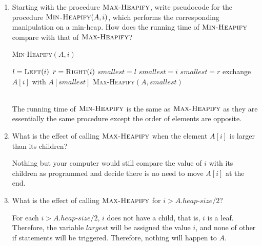 \documentclass[12pt,reqno]{amsart}
\newif\ifanswer
\begin{document}
\begin{enumerate}[1.]
\item Starting with the procedure $\textsc{Max-Heapify}$, write pseudocode for the procedure $\textsc{Min}$-$\textsc{Heapify}(A, i)$, which performs the corresponding manipulation on a min-heap. How does the running time of $\textsc{Min-Heapify}$ compare with that of $\textsc{Max-Heapify}$?

\ifanswer
{}
\begin{algorithm}
\caption{\textsc{Min-Heapify}$(A, i)$}
\begin{algorithmic}[1]
\STATE $l = \textsc{Left}(i)$
\STATE $r = \textsc{Right}(i)$
    \STATE $smallest = l$
\ELSE
    \STATE $smallest = i$
\ENDIF
{}
    \STATE $smallest = r$
\ENDIF
{}
    \STATE exchange $A[i]$ with $A[smallest]$
    \STATE \textsc{Max-Heapify}$(A, smallest)$
\ENDIF
\end{algorithmic}
\end{algorithm}
\\The running time of $\textsc{Min-Heapify}$ is the same as $\textsc{Max-Heapify}$ as they are essentially the same procedure except the order of elements are opposite.
\vspace{1cm}



\item What is the effect of calling $\textsc{Max-Heapify}$ when the element $A[i]$ is larger than its children?

\ifanswer
{}
Nothing but your computer would still compare the value of $i$ with its children as programmed and decide there is no need to move $A[i]$ at the end.
\vspace{1cm}



\item What is the effect of calling $\textsc{Max-Heapify}$ for $i > A.heap$-$size/2$?

\ifanswer
{}
For each $i > A.heap$-$size/2$, $i$ does not have a child, that is, $i$ is a leaf. Therefore, the variable $largest$ will be assigned the value $i$, and none of other if statements will be triggered. Therefore, nothing will happen to $A$.
\vspace{1cm}




\end{enumerate}
\end{document}
